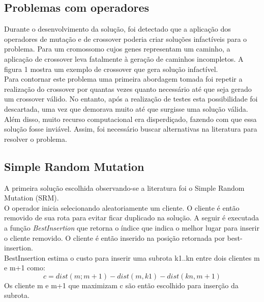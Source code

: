 \documentclass[conference]{IEEEtran}
\begin{document}
\subsection{Problemas com operadores}
Durante o desenvolvimento da solução, foi detectado que a aplicação dos operadores de mutação e de crossover poderia criar soluções infactíveis para o problema. Para um cromossomo cujos genes representam um caminho, a aplicação de crossover leva fatalmente à geração de caminhos incompletos. A figura 1 mostra um exemplo de crossover que gera solução infactível. \\

Para contornar este problema uma primeira abordagem tomada foi repetir a realização do crossover por quantas vezes quanto necessário até que seja gerado um crossover válido. No entanto, após a realização de testes esta possibilidade foi descartada, uma vez que demorava muito até que surgisse uma solução válida. Além disso, muito recurso computacional era disperdiçado, fazendo com que essa solução fosse inviável. Assim, foi necessário buscar alternativas na literatura para resolver o problema.




\subsection{Simple Random Mutation}
A primeira solução escolhida observando-se a literatura foi o Simple Random Mutation (SRM).\\
O operador inicia selecionando aleatoriamente um cliente. O cliente é então removido de sua rota para evitar ficar duplicado na solução. A seguir é executada a função \textit{BestInsertion} que retorna o índice que indica o melhor lugar para inserir o cliente removido. O cliente é então inserido na posição retornada por best-insertion. \\

BestInsertion estima o custo para inserir uma subrota k1..kn entre dois clientes m e m+1 como: \[c = dist(m; m+1) - dist(m,k1) - dist(kn, m+1)\]
Os cliente m e m+1 que maximizam c são então escolhido para inserção da subrota.\\
\end{document}
